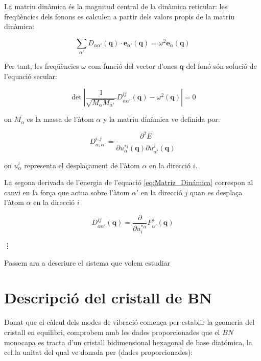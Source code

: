 \documentclass[12pt]{article} %
\let\vec\mathbf %
\begin{document}
La matriu dinàmica és la magnitud central de la dinàmica reticular: les freqüències dels fonons es calculen a partir dels valors propis de la matriu dinàmica:

\begin{equation}
\sum_{\alpha\prime}D_{\alpha\alpha\prime}(\vec q)\cdot\vec e_{\alpha\prime}(\vec q)=\omega^{2}\vec e_{\alpha}(\vec q)
\end{equation}   

Per tant, les freqüències $\omega$ com funció del vector d'ones $\vec q$ del fonó són solució de l'equació secular:

\begin{equation}
\det\left|\frac{1}{\sqrt{M_\alpha M_{\alpha\prime}}}D^{ij}_{\alpha\alpha\prime}\left(\vec q\right)-\omega^2\left(\vec q\right)\right|=0 
\end{equation}

on $M_{\alpha}$ es la massa de l'àtom $\alpha$ y la matriu dinàmica ve definida por:

\begin{equation}
D_{\alpha,\alpha\prime}^{i,j}=\frac{\partial^2 E}{\partial u_{\alpha}^{*i}(\vec q)\partial u_{\alpha\prime}^{j}(\vec q)}
\label{eq:Matriz_Dinámica}
\end{equation}

on $u_{\alpha}^{i}$ representa el despla\c{c}ament de l'àtom $\alpha$ en la direcció $i$.

La segona derivada de l'energia de l'equació \ref{eq:Matriz_Dinámica} correspon al canvi en la for\c{c}a que actua sobre l'àtom $\alpha\prime$ en la direcció $j$ quan es despla\c{c}a l'àtom $\alpha$ en la direcció $i$

\begin{equation}
D_{\alpha\alpha\prime}^{ij}(\vec q)=\frac{\partial}{\partial u^{*\alpha}_{i}}F^{j}_{\alpha'}(\vec q)
\end{equation}

\vdots

Passem ara a descriure el sistema que volem estudiar


\newpage

\section{Descripció del cristall de BN}

Donat que el càlcul dels modes de vibració comen\c{c}a per establir la geomeria del cristall en equilibri, comprobem amb les dades proporcionades que el $BN$ monocapa es tracta d'un cristall bidimensional hexagonal de base diatómica, la ce\l.la unitat del qual ve donada per (dades proporcionades):
\end{document}

